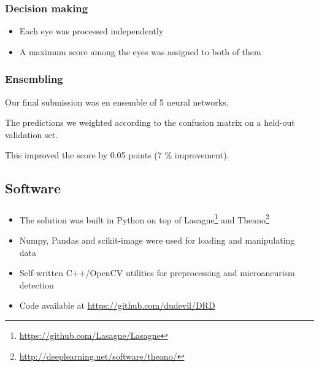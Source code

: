 \begin{frame}\frametitle{Decision making}
\begin{itemize}
\item Each eye was processed independently
\item A  maximum score among the eyes was assigned to both of them
\end{itemize}

\end{frame}

\begin{frame}\frametitle{Ensembling}
\par Our final submission was en ensemble of 5 neural networks.
\par The predictions we weighted according to the confusion matrix on a held-out validation set.
\par This improved the score by 0.05 points (7 \% improvement).
\end{frame}


\subsection{Software}

\begin{frame}\frametitle{}
\begin{itemize}
\item The solution was built in Python on top of Lasagne\footnote{\href{https://github.com/Lasagne/Lasagne}{https://github.com/Lasagne/Lasagne}} and Theano\footnote{\href{http://deeplearning.net/software/theano/}{http://deeplearning.net/software/theano/}}
\item Numpy, Pandas and scikit-image were used for loading and manipulating data
\item Self-written C++/OpenCV utilities for preprocessing and microaneurism detection
\item Code available at \href{https://github.com/dudevil/DRD}{https://github.com/dudevil/DRD}
\end{itemize}
\end{frame}



